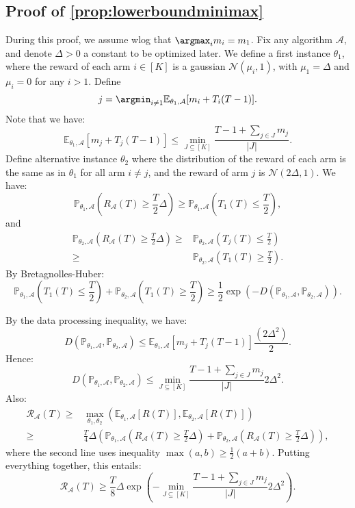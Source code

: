 \subsection{Proof of \cref{prop:lowerboundminimax}}
 
 During this proof, we assume wlog that $\argmax_i m_i= m_1$. Fix any algorithm $\mathcal{A}$, and denote $\Delta>0$ a constant to be optimized later. We define a first instance $\theta_1$, where the reward of each arm $i\in [K]$ is a gaussian $\mathcal{N}(\mu_i,1)$, with $\mu_1=\Delta$ and $\mu_i=0$ for any $i>1$. Define
\[
j = \argmin_{i\neq 1} \mathbb{E}_{\theta_1,\mathcal{A}}[m_i+T_i(T-1)].
\]
Note that we have:
\[
\mathbb{E}_{\theta_1,\mathcal{A}}[m_j+T_j(T-1)] \leq \min_{J\subseteq [K]}\frac{T-1+\sum_{j \in J} m_j}{|J|}.
\]
Define alternative instance $\theta_2$ where the distribution of the reward of each arm is the same as in $\theta_1$ for all arm $i\neq j$, and the reward of arm $j$ is  $\mathcal{N}(2\Delta,1)$.  We have:
\[
\mathbb{P}_{\theta_1,\mathcal{A}}\left(R_\mathcal{A}(T)\geq \frac{T}{2}\Delta\right)\geq \mathbb{P}_{\theta_1, \mathcal{A}}\left(T_1(T)\leq \frac{T}{2}\right), 
\]
and
\begin{align*}
\mathbb{P}_{\theta_2,\mathcal{A}}\left(R_\mathcal{A}(T)\geq \frac{T}{2}\Delta\right)\geq& \mathbb{P}_{\theta_2, \mathcal{A}}\left(T_j(T)\leq \frac{T}{2}\right)\\
\geq& \mathbb{P}_{\theta_2, \mathcal{A}}\left(T_1(T)\geq \frac{T}{2}\right).
\end{align*}
By Bretagnolles-Huber:
\[
\mathbb{P}_{\theta_1, \mathcal{A}}\left(T_1(T)\leq \frac{T}{2}\right)+\mathbb{P}_{\theta_2, \mathcal{A}}\left(T_1(T)\geq \frac{T}{2}\right)\geq \frac{1}{2}\exp(-D(\mathbb{P}_{\theta_1,\mathcal{A}}, \mathbb{P}_{\theta_2,\mathcal{A}})).
\]

By the data processing inequality, we have:
\[
D(\mathbb{P}_{\theta_1,\mathcal{A}}, \mathbb{P}_{\theta_2,\mathcal{A}}) \leq \mathbb{E}_{\theta_1,\mathcal{A}}[m_j+T_j(T-1)] \frac{(2\Delta^2)}{2} .
\] 
Hence:
\[
D(\mathbb{P}_{\theta_1,\mathcal{A}}, \mathbb{P}_{\theta_2,\mathcal{A}})\leq \min_{J\subseteq [K]}\frac{T-1+\sum_{j \in J} m_j}{|J|}2\Delta^2.
\]
Also:
\begin{align*}
    \mathcal{R}_\mathcal{A}(T)\geq& \max_{\theta_1,\theta_2}\left(\mathbb{E}_{\theta_1,\mathcal{A}}\left[R(T)\right],\mathbb{E}_{\theta_2,\mathcal{A}}\left[R(T)\right]\right)\\
    \geq& \frac{T}{4}\Delta\left(\mathbb{P}_{\theta_1,\mathcal{A}}\left(R_\mathcal{A}(T)\geq \frac{T}{2}\Delta\right)+\mathbb{P}_{\theta_2,\mathcal{A}}\left(R_\mathcal{A}(T)\geq \frac{T}{2}\Delta\right)\right),
\end{align*}
where the second line uses inequality $\max(a,b)\geq \frac{1}{2}(a+b)$.
Putting everything together, this entails:
\[
\mathcal{R}_\mathcal{A}(T)\geq \frac{T}{8}\Delta\exp\left(-\min_{J\subseteq [K]}\frac{T-1+\sum_{j \in J} m_j}{|J|}2\Delta^2\right).
\]


